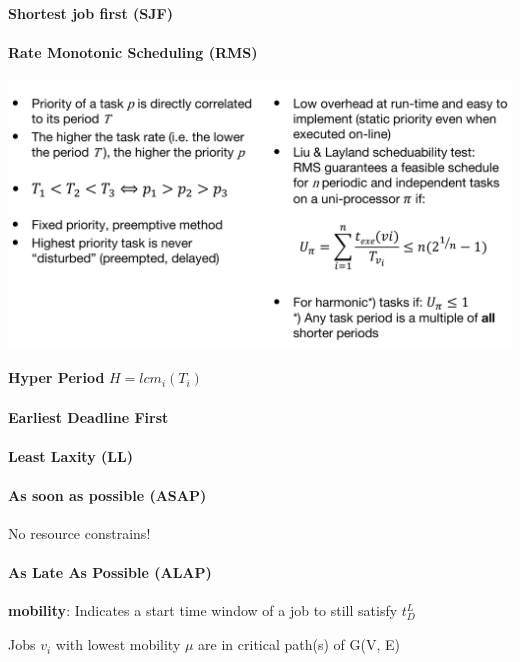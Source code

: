 \documentclass[english]{latex4ei/latex4ei_sheet}
\begin{document}
\paragraph{Shortest job first (SJF)}

\paragraph{Rate Monotonic Scheduling (RMS)}

\begin{center}
  \centering
  \includegraphics[width=\linewidth]{assets/RateMonotonicScheduling.png}
  \label{fig:ratemonotonicscheduling}
\end{center}

\textbf{Hyper Period} $H = lcm_i(T_i)$

\paragraph{Earliest Deadline First}

\paragraph{Least Laxity (LL)}

\paragraph{As soon as possible (ASAP)}
No resource constrains!

\paragraph{As Late As Possible (ALAP)}
\textbf{mobility}: Indicates a start time window of a job to still satisfy $t_D^L$ 

Jobs $v_i$ with lowest mobility $\mu$ are in critical path(s) of G(V, E)
\end{document}
